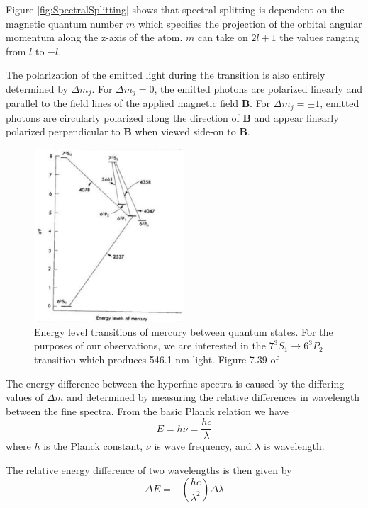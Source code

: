 \documentclass[twocolumn]{article}
\begin{document}
		Figure \ref{fig:SpectralSplitting} shows that spectral splitting is dependent on the magnetic quantum number $m$ which specifies the projection of the orbital angular momentum along the z-axis of the atom.
		$m$ can take on $2l+1$ the values ranging from $l$ to $-l$.
		
		The polarization of the emitted light during the transition is also entirely determined by $\Delta m_j$.
		For $\Delta m_j = 0$, the emitted photons are polarized linearly and parallel to the field lines of the applied magnetic field $\mathbf{B}$.
		For $\Delta m_j=\pm1$, emitted photons are circularly polarized along the direction of $\mathbf{B}$ and appear linearly polarized perpendicular to $\mathbf{B}$ when viewed side-on to $\mathbf{B}$.
		\begin{figure}
			\centering
			\includegraphics[width=0.5\textwidth]{Images/MercuryEnergyLevelsDiagram.png}
			\caption{Energy level transitions of mercury between quantum states. For the purposes of our observations, we are interested in the $7^3S_1 \rightarrow 6^3P_2$ transition which produces 546.1 nm light. Figure 7.39 of \cite{melissinos_experiments_1966}}
			\label{fig:MercuryEnergyLevelsDiagram}
		\end{figure}
		
		The energy difference between the hyperfine spectra is caused by the differing values of $\Delta m$ and determined by measuring the relative differences in wavelength between the fine spectra.
		From the basic Planck relation we have
		\begin{equation}
			E = h\nu = \frac{hc}{\lambda}
		\end{equation}
		where $h$ is the Planck constant, $\nu$ is wave frequency, and $\lambda$ is wavelength.
		
		The relative energy difference of two wavelengths is then given by
		\begin{equation}
			\Delta E = -\left(\frac{hc}{\lambda^2}\right) \Delta \lambda
		\end{equation}
	
\end{document}

